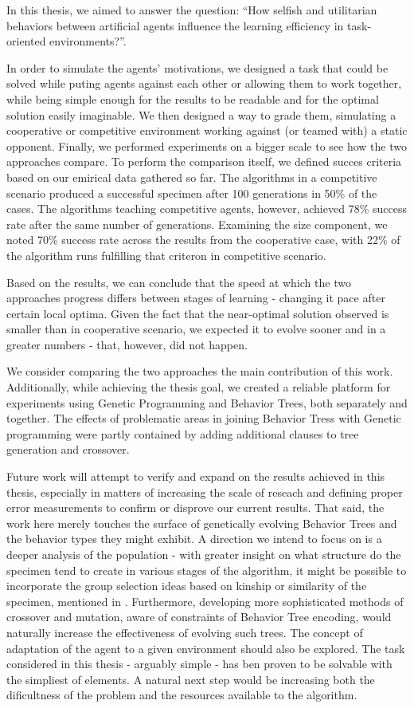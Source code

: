 In this thesis, we aimed to answer the question:  ``How selfish and utilitarian behaviors between artificial agents influence the learning efficiency in task-oriented environments?''.

In order to simulate the agents' motivations, we designed a task that could be solved while puting agents against each other or allowing them to work together, while being simple enough for the results to be readable and for the optimal solution easily imaginable. We then designed a way to grade them, simulating a cooperative or competitive environment working against (or teamed with) a static opponent. Finally, we performed experiments on a bigger scale to see how the two approaches compare. To perform the comparison itself, we defined succes criteria based on our emirical data gathered so far. The algorithms in a competitive scenario produced a successful specimen after 100 generations in 50\% of the cases. The algorithms teaching competitive agents, however, achieved 78\% success rate after the same number of generations. Examining the size component, we noted 70\% success rate across the results from the cooperative case, with 22\% of the algorithm runs fulfilling that criteron in competitive scenario.

Based on the results, we can conclude that the speed at which the two approaches progress differs between stages of learning - changing it pace after certain local optima. Given the fact that the near-optimal solution observed is smaller than in cooperative scenario, we expected it to evolve sooner and in a greater numbers - that, however, did not happen.

We consider comparing the two approaches the main contribution of this work. Additionally, while achieving the thesis goal, we created a reliable platform for experiments using Genetic Programming and Behavior Trees, both separately and together. The effects of problematic areas in joining Behavior Tress with Genetic programming were partly contained by adding additional clauses to tree generation and crossover.

Future work will attempt to verify and expand on the results achieved in this thesis, especially in matters of increasing the scale of reseach and defining proper error measurements to confirm or disprove our current results. That said, the work here merely touches the surface of genetically evolving Behavior Trees and the behavior types they might exhibit. A direction we intend to focus on is a deeper analysis of the population - with greater insight on what structure do the specimen tend to create in various stages of the algorithm, it might be possible to incorporate the group selection ideas based on kinship or similarity of the specimen, mentioned in \cite{cooperationevolution}. Furthermore, developing more sophisticated methods of crossover and mutation, aware of constraints of Behavior Tree encoding, would naturally increase the effectiveness of evolving such trees. The concept of adaptation of the agent to a given environment should also be explored. The task considered in this thesis - arguably simple - has ben proven to be solvable with the simpliest of elements. A natural next step would be increasing both the dificultness of the problem and the resources available to the algorithm.
